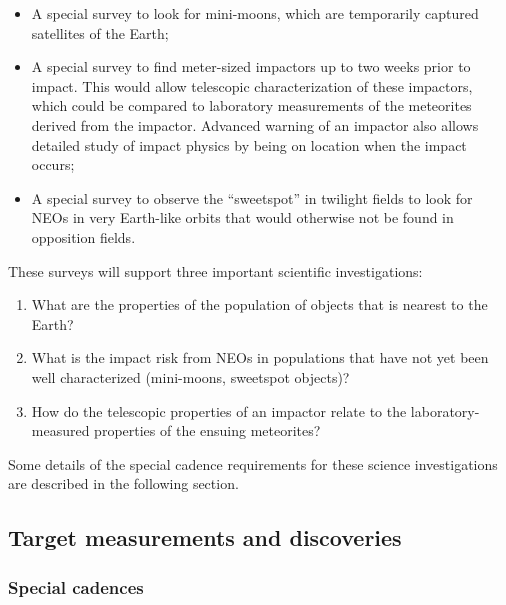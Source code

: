 \begin{itemize}
\item A special survey to look for mini-moons, which are temporarily captured
satellites of the Earth;
\item A special survey to find meter-sized impactors up to two weeks prior to impact.
This would allow telescopic characterization of these impactors, which could
be compared to laboratory measurements of the meteorites derived from
the impactor. Advanced warning of an impactor also allows detailed
study of impact physics by being on location when the impact
occurs;
\item A special survey to observe the ``sweetspot'' in twilight fields
to look for NEOs in very Earth-like orbits that would otherwise not
be found in opposition fields.
\end{itemize}

These surveys will support three important scientific investigations:
\begin{enumerate}
\item What are the properties of the population of objects that is
nearest to the Earth?
\item What is the impact risk from NEOs in populations that
have not yet been well characterized (mini-moons, sweetspot objects)?
\item How do the telescopic properties of an impactor relate to the
laboratory-measured properties of the ensuing meteorites?
\end{enumerate}

Some details of the special cadence requirements for these
science investigations are described in the following section.


\subsection{Target measurements and discoveries}
\label{sec:\secname:targets}

\subsubsection{Special cadences}

